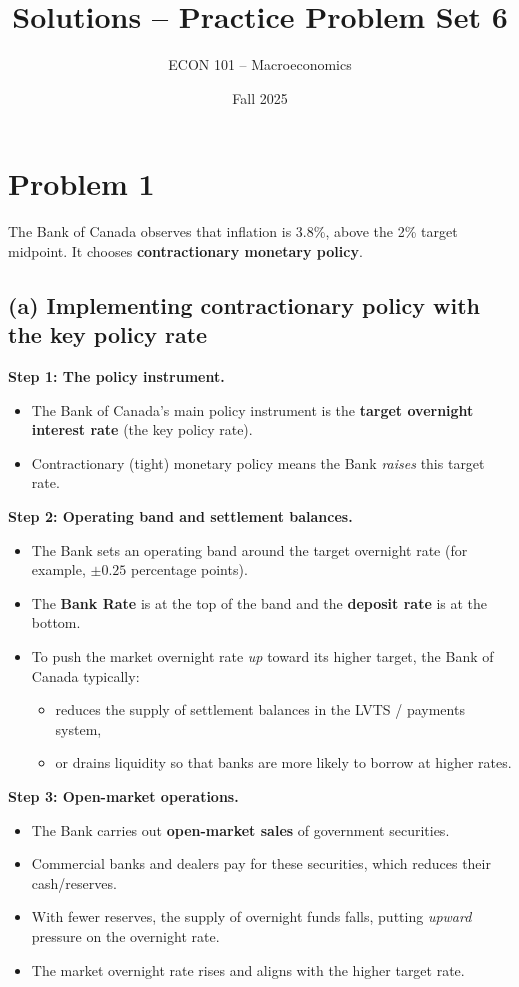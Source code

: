 \documentclass[12pt]{article}
\title{Solutions -- Practice Problem Set 6}
\author{ECON 101 -- Macroeconomics}
\date{Fall 2025}
\begin{document}
\maketitle

\section*{Problem 1}

The Bank of Canada observes that inflation is 3.8\%, above the 2\% target midpoint. It chooses \textbf{contractionary monetary policy}.

\subsection*{(a) Implementing contractionary policy with the key policy rate}

\textbf{Step 1: The policy instrument.}
\begin{itemize}
    \item The Bank of Canada's main policy instrument is the \textbf{target overnight interest rate} (the key policy rate).
    \item Contractionary (tight) monetary policy means the Bank \emph{raises} this target rate.
\end{itemize}

\textbf{Step 2: Operating band and settlement balances.}
\begin{itemize}
    \item The Bank sets an operating band around the target overnight rate (for example, $\pm 0.25$ percentage points).
    \item The \textbf{Bank Rate} is at the top of the band and the \textbf{deposit rate} is at the bottom.
    \item To push the market overnight rate \emph{up} toward its higher target, the Bank of Canada typically:
    \begin{itemize}
        \item reduces the supply of settlement balances in the LVTS / payments system,
        \item or drains liquidity so that banks are more likely to borrow at higher rates.
    \end{itemize}
\end{itemize}

\newpage
\textbf{Step 3: Open-market operations.}
\begin{itemize}
    \item The Bank carries out \textbf{open-market sales} of government securities.
    \item Commercial banks and dealers pay for these securities, which reduces their cash/reserves.
    \item With fewer reserves, the supply of overnight funds falls, putting \emph{upward} pressure on the overnight rate.
    \item The market overnight rate rises and aligns with the higher target rate.
\end{itemize}
\end{document}
